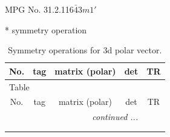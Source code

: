 \documentclass[fleqn,8pt]{jsarticle}
\begin{document}
\setcounter{MaxMatrixCols}{32}

\renewcommand{\tablename}{Table~}
\renewcommand{\figurename}{Figure~}
\begin{center}
\LARGE
MPG No. 31.2.116\quad$\bar{4}3m1'$
\end{center}
* symmetry operation
\renewcommand{\arraystretch}{1.3}
\begin{longtable}{ccccc}
\caption{Symmetry operations for 3d polar vector.}
 \\
 \hline \hline
No. & tag & matrix (polar) & det & TR \\ \hline \endfirsthead

\multicolumn{4}{l}{\tablename\ \thetable{}} \\
 \hline \hline
No. & tag & matrix (polar) & det & TR \\ \hline \endhead

 \hline \hline
\multicolumn{4}{r}{\footnotesize\it continued ...} \\ \endfoot

 \hline \hline
\multicolumn{4}{r}{} \\ \endlastfoot


\end{longtable}
\end{document}
